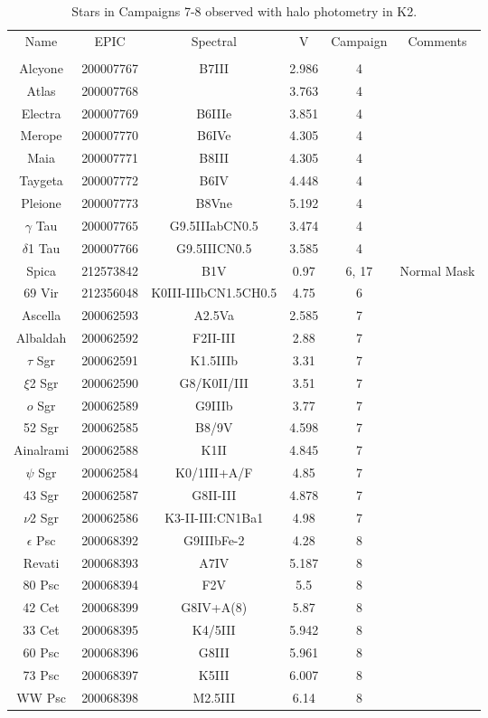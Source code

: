 \begin{table*}
\caption{Stars in Campaigns 7-8 observed with halo photometry in K2.\label{table_0}}
\begin{tabular}{cccccc}
\hline \hline
Name & EPIC & Spectral & V & Campaign & Comments \\
 &  &  &  &  &  \\
\hline
Alcyone & 200007767 & B7III & 2.986 & 4 & \tablenotemark{a} \\
Atlas & 200007768 &  & 3.763 & 4 & \tablenotemark{a} \\
Electra & 200007769 & B6IIIe & 3.851 & 4 & \tablenotemark{a} \\
Merope & 200007770 & B6IVe & 4.305 & 4 & \tablenotemark{a} \\
Maia & 200007771 & B8III & 4.305 & 4 & \tablenotemark{a} \\
Taygeta & 200007772 & B6IV & 4.448 & 4 & \tablenotemark{a} \\
Pleione & 200007773 & B8Vne & 5.192 & 4 & \tablenotemark{a} \\
$\gamma$ Tau & 200007765 & G9.5IIIabCN0.5 & 3.474 & 4 &  \\
$\delta$1 Tau & 200007766 & G9.5IIICN0.5 & 3.585 & 4 &  \\
Spica & 212573842 & B1V & 0.97 & 6, 17 & Normal Mask \\
69 Vir & 212356048 & K0III-IIIbCN1.5CH0.5 & 4.75 & 6 &  \\
Ascella & 200062593 & A2.5Va & 2.585 & 7 &  \\
Albaldah & 200062592 & F2II-III & 2.88 & 7 &  \\
$\tau$ Sgr & 200062591 & K1.5IIIb & 3.31 & 7 &  \\
$\xi$2 Sgr & 200062590 & G8/K0II/III & 3.51 & 7 &  \\
$o$ Sgr & 200062589 & G9IIIb & 3.77 & 7 &  \\
52 Sgr & 200062585 & B8/9V & 4.598 & 7 &  \\
Ainalrami & 200062588 & K1II & 4.845 & 7 &  \\
$\psi$ Sgr & 200062584 & K0/1III+A/F & 4.85 & 7 &  \\
43 Sgr & 200062587 & G8II-III & 4.878 & 7 &  \\
$\nu$2 Sgr & 200062586 & K3-II-III:CN1Ba1 & 4.98 & 7 &  \\
$\epsilon$ Psc & 200068392 & G9IIIbFe-2 & 4.28 & 8 &  \\
Revati & 200068393 & A7IV & 5.187 & 8 &  \\
80 Psc & 200068394 & F2V & 5.5 & 8 &  \\
42 Cet & 200068399 & G8IV+A(8) & 5.87 & 8 &  \\
33 Cet & 200068395 & K4/5III & 5.942 & 8 &  \\
60 Psc & 200068396 & G8III & 5.961 & 8 &  \\
73 Psc & 200068397 & K5III & 6.007 & 8 &  \\
WW Psc & 200068398 & M2.5III & 6.14 & 8 &  \\
\hline
\end{tabular}
\end{table*}
